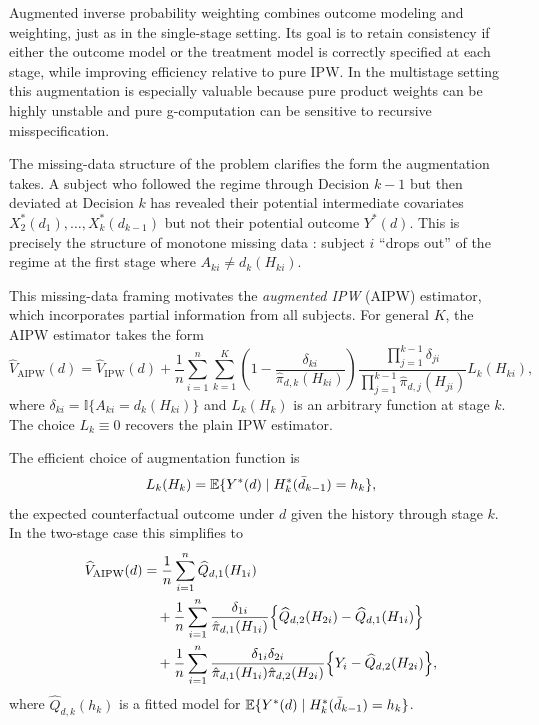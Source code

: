 \documentclass[master.tex]{subfiles}
\begin{document}
Augmented inverse probability weighting combines outcome modeling and weighting, just as in the single-stage setting. Its goal is to retain consistency if either the outcome model or the treatment model is correctly specified at each stage, while improving efficiency relative to pure IPW. In the multistage setting this augmentation is especially valuable because pure product weights can be highly unstable and pure g-computation can be sensitive to recursive misspecification.

The missing-data structure of the problem clarifies the form the augmentation takes. A subject who followed the regime through Decision $k-1$ but then deviated at Decision $k$ has revealed their potential intermediate covariates $X_2^*(d_1),\ldots,X_k^*(d_{k-1})$ but not their potential outcome $Y^*(d)$. This is precisely the structure of monotone missing data \citep{robins1994estimation}: subject $i$ ``drops out'' of the regime at the first stage where $A_{ki} \neq d_k(H_{ki})$.

This missing-data framing motivates the \emph{augmented IPW} (AIPW) estimator, which incorporates partial information from all subjects. For general $K$, the AIPW estimator takes the form
\[
\widehat{V}_{\mathrm{AIPW}}(d)
= \widehat{V}_{\mathrm{IPW}}(d)
+ \frac{1}{n}\sum_{i=1}^n \sum_{k=1}^K
\left(1 - \frac{\delta_{ki}}{\hat\pi_{d,k}(H_{ki})}\right)
\frac{\prod_{j=1}^{k-1}\delta_{ji}}{\prod_{j=1}^{k-1}\hat\pi_{d,j}(H_{ji})}
L_k(H_{ki}),
\]
where $\delta_{ki} = \mathbb{I}\{A_{ki} = d_k(H_{ki})\}$ and $L_k(H_k)$ is an arbitrary function at stage $k$. The choice $L_k \equiv 0$ recovers the plain IPW estimator.

The efficient choice of augmentation function is
\[
L_k(H_k) = \mathbb{E}\{Y^*(d) \mid H_k^*(\bar{d}_{k-1}) = h_k\},
\]
the expected counterfactual outcome under $d$ given the history through stage $k$. In the two-stage case this simplifies to
\begin{align*}
\widehat{V}_{\mathrm{AIPW}}(d)
&= \frac{1}{n}\sum_{i=1}^n \widehat{Q}_{d,1}(H_{1i})\\
&\quad + \frac{1}{n}\sum_{i=1}^n
\frac{\delta_{1i}}{\hat\pi_{d,1}(H_{1i})}
\Bigl\{\widehat{Q}_{d,2}(H_{2i}) - \widehat{Q}_{d,1}(H_{1i})\Bigr\}\\
&\quad + \frac{1}{n}\sum_{i=1}^n
\frac{\delta_{1i}\delta_{2i}}{\hat\pi_{d,1}(H_{1i})\hat\pi_{d,2}(H_{2i})}
\Bigl\{Y_i - \widehat{Q}_{d,2}(H_{2i})\Bigr\},
\end{align*}
where $\widehat{Q}_{d,k}(h_k)$ is a fitted model for $\mathbb{E}\{Y^*(d) \mid H_k^*(\bar{d}_{k-1})=h_k\}$.
\end{document}
